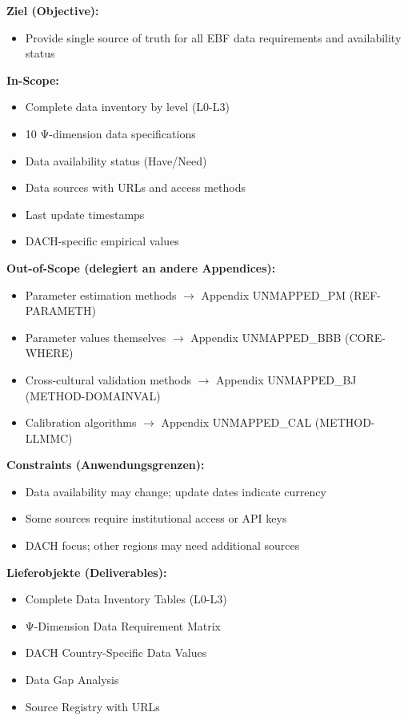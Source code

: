 \begin{tcolorbox}[
    colback=orange!5!white,
    colframe=orange!75!black,
    title={\textbf{Appendix Scope: Ziel / In-Scope / Out-of-Scope / Constraints}},
    fonttitle=\bfseries
]

\textbf{Ziel (Objective):}
\begin{itemize}[nosep]
    \item Provide single source of truth for all EBF data requirements and availability status
\end{itemize}

\textbf{In-Scope:}
\begin{itemize}[nosep]
    \item Complete data inventory by level (L0-L3)
    \item 10 Ψ-dimension data specifications
    \item Data availability status (Have/Need)
    \item Data sources with URLs and access methods
    \item Last update timestamps
    \item DACH-specific empirical values
\end{itemize}

\textbf{Out-of-Scope (delegiert an andere Appendices):}
\begin{itemize}[nosep]
    \item Parameter estimation methods $\rightarrow$ Appendix UNMAPPED_PM (REF-PARAMETH)
    \item Parameter values themselves $\rightarrow$ Appendix UNMAPPED_BBB (CORE-WHERE)
    \item Cross-cultural validation methods $\rightarrow$ Appendix UNMAPPED_BJ (METHOD-DOMAINVAL)
    \item Calibration algorithms $\rightarrow$ Appendix UNMAPPED_CAL (METHOD-LLMMC)
\end{itemize}

\textbf{Constraints (Anwendungsgrenzen):}
\begin{itemize}[nosep]
    \item Data availability may change; update dates indicate currency
    \item Some sources require institutional access or API keys
    \item DACH focus; other regions may need additional sources
\end{itemize}

\textbf{Lieferobjekte (Deliverables):}
\begin{itemize}[nosep]
    \item Complete Data Inventory Tables (L0-L3)
    \item Ψ-Dimension Data Requirement Matrix
    \item DACH Country-Specific Data Values
    \item Data Gap Analysis
    \item Source Registry with URLs
\end{itemize}

\end{tcolorbox}


